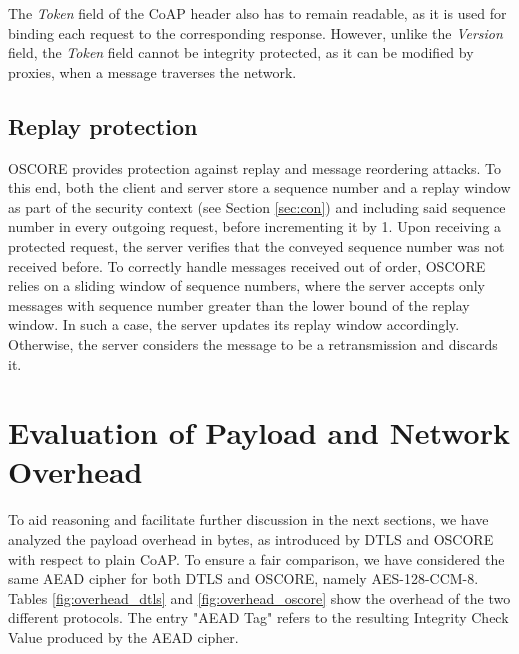 {The \emph{Token} field of the CoAP header also has to remain readable, as it is used for binding each request to the corresponding response. However, unlike the \emph{Version} field, the \emph{Token} field cannot be integrity protected, as it can be modified by proxies, when a message traverses the network.

\subsection{Replay protection}
\label{sec:repl}
OSCORE provides protection against replay and message reordering attacks. To this end, both the client and server store a sequence number and a replay window as part of the security context (see Section \ref{sec:con}) and including said sequence number in every outgoing request, before incrementing it by 1. Upon receiving a protected request, the server verifies that the conveyed sequence number was not received before. To correctly handle messages received out of order, OSCORE relies on a sliding window of sequence numbers, where the server accepts only messages with sequence number greater than the lower bound of the replay window. In such a case, the server updates its replay window accordingly. Otherwise, the server considers the message to be a retransmission and discards it.

\section{Evaluation of Payload and Network Overhead}
\label{s:payloadoverhead}
To aid reasoning and facilitate further discussion in the next sections, we have analyzed the payload overhead in bytes, as introduced by DTLS and OSCORE with respect to plain CoAP. To ensure a fair comparison, we have considered the same AEAD cipher for both DTLS and OSCORE, namely AES-128-CCM-8. Tables \ref{fig:overhead_dtls} and \ref{fig:overhead_oscore} show the overhead of the two different protocols. The entry "AEAD Tag" refers to the resulting Integrity Check Value produced by the AEAD cipher.

\begin{table}[ht]


\end{table}}
